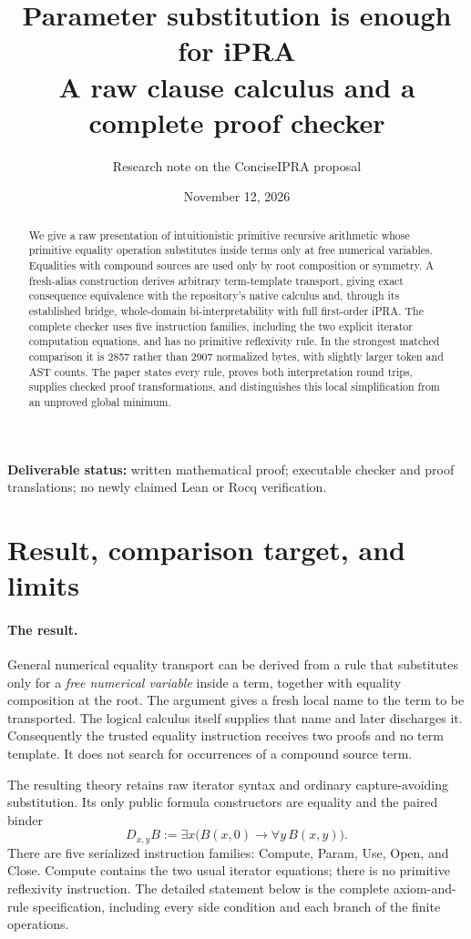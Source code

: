 \documentclass[11pt,letterpaper]{article}
\title{\textbf{Parameter substitution is enough for iPRA}\\[0.5em]
 \large A raw clause calculus and a complete proof checker}
\author{Research note on the ConciseIPRA proposal}
\date{November 12, 2026}
\begin{document}
\maketitle
\begin{abstract}
We give a raw presentation of intuitionistic primitive recursive arithmetic
whose primitive equality operation substitutes inside terms only at free
numerical variables. Equalities with compound sources are used only by
root composition or symmetry. A fresh-alias construction derives arbitrary
term-template transport, giving exact consequence equivalence with the
repository's native calculus and, through its established bridge,
whole-domain bi-interpretability with full first-order iPRA.
The complete checker uses five instruction families, including the two
explicit iterator computation equations, and has no primitive reflexivity
rule. In the strongest matched comparison it is 2857 rather than 2907
normalized bytes, with slightly larger token and AST counts.
The paper states every rule, proves both interpretation round trips,
supplies checked proof transformations, and distinguishes this local
simplification from an unproved global minimum.
\end{abstract}
\vfill
\noindent\textbf{Deliverable status:} written mathematical proof; executable
checker and proof translations; no newly claimed Lean or Rocq verification.
\newpage
\tableofcontents
\newpage

\section{Result, comparison target, and limits}

\paragraph{The result.}
General numerical equality transport can be derived from a rule that
substitutes only for a \emph{free numerical variable} inside a term, together
with equality composition at the root. The argument gives a fresh local
name to the term to be transported. The logical calculus itself supplies
that name and later discharges it. Consequently the trusted equality
instruction receives two proofs and no term template. It does not search
for occurrences of a compound source term.

The resulting theory retains raw iterator syntax and ordinary
capture-avoiding substitution. Its only public formula constructors are
equality and the paired binder
\[
 D_{x,y}B := \exists x\bigl(B(x,0)\to\forall y\,B(x,y)\bigr).
\]
There are five serialized instruction families: Compute, Param, Use,
Open, and Close. Compute contains the two usual iterator equations;
there is no primitive reflexivity instruction. The detailed statement
below is the complete axiom-and-rule specification, including every
side condition and each branch of the finite operations.
\end{document}
